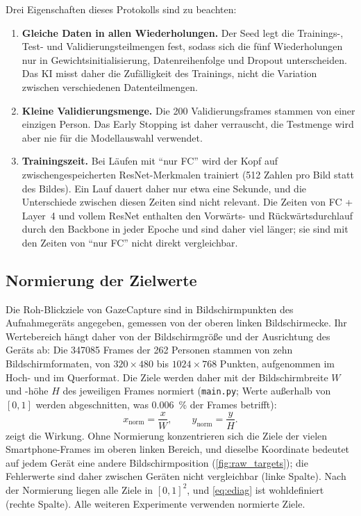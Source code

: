 \documentclass[
  11pt,
  a4paper,
  oneside,
  DIV=12,
  BCOR=8mm,
  parskip=half,
  headings=normal,
  bibliography=totoc,
  listof=totoc
]{scrreprt}
\newcommand{\code}[1]{\texttt{#1}}
\begin{document}
Drei Eigenschaften dieses Protokolls sind zu beachten:
\begin{enumerate}[nosep]
  \item \textbf{Gleiche Daten in allen Wiederholungen.} Der Seed legt die
        Trainings-, Test- und Validierungsteilmengen fest, sodass sich die
        fünf Wiederholungen nur in Gewichtsinitialisierung, Datenreihenfolge
        und Dropout unterscheiden. Das KI misst daher die Zufälligkeit des
        Trainings, nicht die Variation zwischen verschiedenen
        Datenteilmengen.
  \item \textbf{Kleine Validierungsmenge.} Die 200 Validierungsframes stammen
        von einer einzigen Person. Das Early Stopping ist daher verrauscht,
        die Testmenge wird aber nie für die Modellauswahl verwendet.
  \item \textbf{Trainingszeit.} Bei Läufen mit \enquote{nur FC} wird der Kopf
        auf zwischengespeicherten ResNet-Merkmalen trainiert (512 Zahlen pro
        Bild statt des Bildes). Ein Lauf dauert daher nur etwa eine Sekunde,
        und die Unterschiede zwischen diesen Zeiten sind nicht relevant. Die
        Zeiten von FC + Layer~4 und vollem ResNet enthalten den Vorwärts- und
        Rückwärtsdurchlauf durch den Backbone in jeder Epoche und sind daher
        viel länger; sie sind mit den Zeiten von \enquote{nur FC} nicht
        direkt vergleichbar.
\end{enumerate}

\subsection{Normierung der Zielwerte}
\label{sec:normalization}

Die Roh-Blickziele von GazeCapture sind in Bildschirmpunkten des
Aufnahmegeräts angegeben, gemessen von der oberen linken Bildschirmecke. Ihr
Wertebereich hängt daher von der Bildschirmgröße und der Ausrichtung des
Geräts ab: Die \num{347085} Frames der 262 Personen stammen von zehn
Bildschirmformaten, von $320\times480$ bis $1024\times768$ Punkten,
aufgenommen im Hoch- und im Querformat. Die Ziele werden daher mit der
Bildschirmbreite $W$ und -höhe $H$ des jeweiligen Frames normiert
(\code{main.py}; Werte außerhalb von $[0,1]$ werden abgeschnitten, was
\SI{0,006}{\percent} der Frames betrifft):
\begin{equation}
  x_{\mathrm{norm}} = \frac{x}{W},\qquad y_{\mathrm{norm}} = \frac{y}{H}.
\end{equation}
 zeigt die Wirkung. Ohne Normierung konzentrieren
sich die Ziele der vielen Smartphone-Frames im oberen linken Bereich, und
dieselbe Koordinate bedeutet auf jedem Gerät eine andere Bildschirmposition
(\cref{fig:raw_targets}); die Fehlerwerte sind daher zwischen Geräten nicht
vergleichbar (linke Spalte). Nach der Normierung liegen alle Ziele in
$[0,1]^2$, und \cref{eq:ediag} ist wohldefiniert (rechte Spalte). Alle
weiteren Experimente verwenden normierte Ziele.
\end{document}
